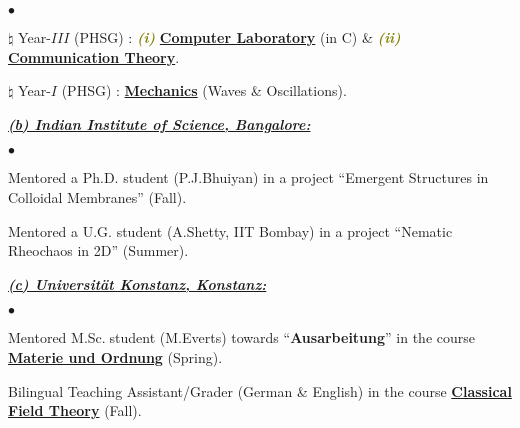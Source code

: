 \documentclass[margin,line]{res}
\newenvironment{list1}{
  \begin{list}{\ding{113}}{%
      \setlength{\itemsep}{0in}
      \setlength{\parsep}{0in} \setlength{\parskip}{0in}
      \setlength{\topsep}{0in} \setlength{\partopsep}{0in} 
      \setlength{\leftmargin}{0.17in}}}{\end{list}}
\newenvironment{list2}{
  \begin{list}{$\bullet$}{%
      \setlength{\itemsep}{0in}
      \setlength{\parsep}{0in} \setlength{\parskip}{0in}
      \setlength{\topsep}{0in} \setlength{\partopsep}{0in} 
      \setlength{\leftmargin}{0.2in}}}{\end{list}}
\begin{document}
\begin{resume}
\begin{list2}
\item[$\pmb{\natural}$] Year-$III$ (PHSG) : \textcolor{olive}{\textit{\textbf{(i)}}} 
                          \href{https://amitbny.github.io/akb.github.io/numerlabIVB.html}{\bf Computer Laboratory} (in C) \& 
                          \textcolor{olive}{\textit{\textbf{(ii)}}} 
                          \href{https://amitbny.github.io/akb.github.io/commun.html}{\bf Communication Theory}.
\item[$\pmb{\natural}$] Year-$I$ (PHSG) : \href{https://amitbny.github.io/akb.github.io/wavevibr.html}{\bf Mechanics} (Waves \& Oscillations).
\end{list2}
\begin{list1}
\vspace{1mm}
\item[] \textcolor{alizarin}{\underline{\textbf{\textit{(b) Indian Institute of Science, Bangalore:}}}}
\vspace{1mm}
\end{list1}
\begin{list1}
\item[] \textcolor{iris}{}
\vspace{1mm}
\end{list1}
\begin{list2}
\item Mentored a Ph.D. student (P.J.Bhuiyan) in a project ``{\sf Emergent Structures in Colloidal Membranes}'' (Fall). 
\item Mentored a U.G. student (A.Shetty, IIT Bombay) in a project ``{\sf Nematic Rheochaos in 2D}'' (Summer). 
\end{list2}
\begin{list1}
\vspace{1mm}
\item[] \textcolor{alizarin}{\underline{\textbf{\textit{(c) Universit\"at Konstanz, Konstanz:}}}}
\vspace{1mm}
\end{list1}
\begin{list1}
\item[] \textcolor{iris}{}
\vspace{1mm}
\end{list1}
\begin{list2}
\item Mentored M.Sc.$\;$student (M.Everts) towards ``{\bf Ausarbeitung}'' in the course 
      \href{http://cms.uni-konstanz.de/physik/fuchs/teaching/materie-und-ordnung/}{\bf Materie und Ordnung} (Spring). 
\item Bilingual Teaching Assistant/Grader (German \& English) in the course 
      \href{http://theorie.physik.uni-konstanz.de/thomas/stud/classfield/}{\bf Classical Field Theory} (Fall).  
\end{list2}
\vspace{1mm}


\end{resume}
\end{document}
